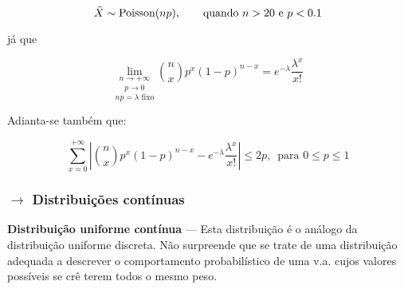 $$
    \Tilde{X} \sim \text{Poisson}(np),\qquad \text{quando } n > 20 \text{ e } p < 0.1
$$

\noindent já que

$$
    \underset{np = \lambda \text{ fixo}}{\underset{p \to 0}{\underset{n \to +\infty}{\lim}}} \binom{n}{x}p^x(1 - p)^{n-x} = e^{-\lambda}\frac{\lambda^x}{x!}
$$

\noindent Adianta-se também que:

$$
    \sum_{x = 0}^{+\infty} \left|\binom{n}{x}p^x(1 - p)^{n-x} - e^{-\lambda}\frac{\lambda^x}{x!}\right| \leq 2p,\;\: \text{para $0 \leq p \leq 1$}
$$


\newpage
\subsubsection[2.2.3 Distribuições contínuas]{$\pmb{\rightarrow}$ Distribuições contínuas}

\noindent \textbf{Distribuição uniforme contínua} --- Esta distribuição é o análogo da distribuição uniforme discreta. Não surpreende que se trate de uma distribuição adequada a descrever o comportamento probabilístico de uma v.a. cujos valores possíveis se crê terem todos o mesmo peso.

